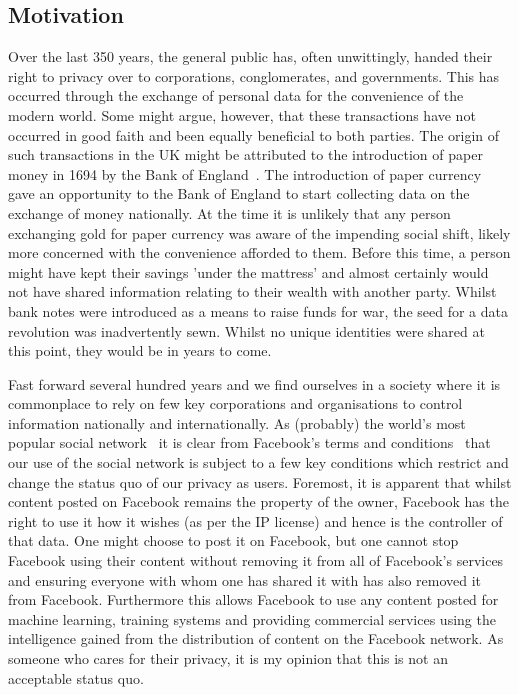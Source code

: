 \subsection{Motivation}

Over the last 350 years, the general public has, often unwittingly, handed their right to privacy over to corporations, conglomerates, and governments. This has occurred through the exchange of personal data for the convenience of the modern world. Some might argue, however, that these transactions have not occurred in good faith and been equally beneficial to both parties.
\newline
The origin of such transactions in the UK might be attributed to the introduction of paper money in 1694 by the Bank of England~\autocite{bankofengland:2016:online}. The introduction of paper currency gave an opportunity to the Bank of England to start collecting data on the exchange of money nationally. At the time it is unlikely that any person exchanging gold for paper currency was aware of the impending social shift, likely more concerned with the convenience afforded to them. Before this time, a person might have kept their savings 'under the mattress' and almost certainly would not have shared information relating to their wealth with another party. Whilst bank notes were introduced as a means to raise funds for war, the seed for a data revolution was inadvertently sewn. Whilst no unique identities were shared at this point, they would be in years to come.

Fast forward several hundred years and we find ourselves in a society where it is commonplace to rely on few key corporations and organisations to control information nationally and internationally. As (probably) the world's most popular social network~\autocite{worldmapsocialnetworks:2017:online} it is clear from Facebook's terms and conditions~\autocite{facebookterms:2015:online} that our use of the social network is subject to a few key conditions which restrict and change the status quo of our privacy as users. Foremost, it is apparent that whilst content posted on Facebook remains the property of the owner, Facebook has the right to use it how it wishes (as per the IP license) and hence is the controller of that data. One might choose to post it on Facebook, but one cannot stop Facebook using their content without removing it from all of Facebook's services and ensuring everyone with whom one has shared it with has also removed it from Facebook. Furthermore this allows Facebook to use any content posted for machine learning, training systems and providing commercial services using the intelligence gained from the distribution of content on the Facebook network. As someone who cares for their privacy, it is my opinion that this is not an acceptable status quo.

